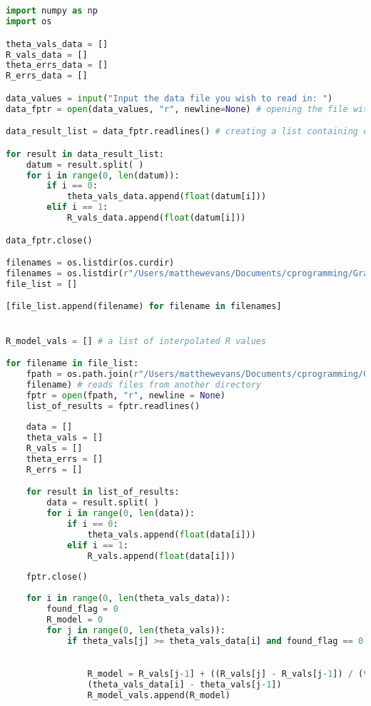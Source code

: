 \documentclass[11pt]{article}
\begin{document}
\begin{footnotesize}
\begin{lstlisting}[language=Python,showstringspaces=false]


import numpy as np
import os

theta_vals_data = []
R_vals_data = []
theta_errs_data = []
R_errs_data = []

data_values = input("Input the data file you wish to read in: ")
data_fptr = open(data_values, "r", newline=None) # opening the file with the observed data 

data_result_list = data_fptr.readlines() # creating a list containing observed data results

for result in data_result_list:
    datum = result.split( )
    for i in range(0, len(datum)):
        if i == 0:
            theta_vals_data.append(float(datum[i]))
        elif i == 1:
            R_vals_data.append(float(datum[i]))

data_fptr.close()

filenames = os.listdir(os.curdir)
filenames = os.listdir(r"/Users/matthewevans/Documents/cprogramming/Graphs/PHY3138/PHY3147/phi0_0.505_late")
file_list = []

[file_list.append(filename) for filename in filenames]


R_model_vals = [] # a list of interpolated R values

for filename in file_list:
    fpath = os.path.join(r"/Users/matthewevans/Documents/cprogramming/Graphs/PHY3138/PHY3147/phi0_0.505_late", \
    filename) # reads files from another directory
    fptr = open(fpath, "r", newline = None)
    list_of_results = fptr.readlines()
 
    data = []
    theta_vals = []
    R_vals = []
    theta_errs = []
    R_errs = [] 

    for result in list_of_results:
        data = result.split( )
        for i in range(0, len(data)):
            if i == 0:
                theta_vals.append(float(data[i]))
            elif i == 1:
                R_vals.append(float(data[i]))
        
    fptr.close()
      
    for i in range(0, len(theta_vals_data)):
        found_flag = 0
        R_model = 0
        for j in range(0, len(theta_vals)):
            if theta_vals[j] >= theta_vals_data[i] and found_flag == 0:
              

                R_model = R_vals[j-1] + ((R_vals[j] - R_vals[j-1]) / (theta_vals[j] - theta_vals[j-1])) * \
                (theta_vals_data[i] - theta_vals[j-1])
                R_model_vals.append(R_model)
               

\end{lstlisting}
\end{footnotesize}
\end{document}
